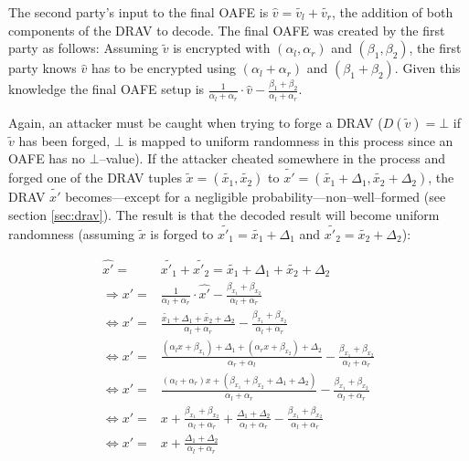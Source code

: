 The second party's input to the final OAFE is $\widehat{v} = \widetilde{v_l} +
\widetilde{v_r}$, the addition of both components of the DRAV to decode.  The
final OAFE was created by the first party as follows: Assuming $\widetilde{v}$
is encrypted with $(\alpha_l, \alpha_r)$ and $(\beta_1, \beta_2)$, the first
party knows $\widehat{v}$ has to be encrypted using $(\alpha_l + \alpha_r)$ and
$(\beta_1 + \beta_2)$.  Given this knowledge the final OAFE setup is
$\frac{1}{\alpha_l + \alpha_r} \cdot \widehat{v} - \frac{\beta_1 +
\beta_2}{\alpha_l + \alpha_r}$.

Again, an attacker must be caught when trying to forge a DRAV ($D(\widetilde{v})
= \bot$ if $\widetilde{v}$ has been forged, $\bot$ is mapped to uniform
randomness in this process since an OAFE has no $\bot$--value). If the attacker
cheated somewhere in the process and forged one of the DRAV tuples
$\widetilde{x} = (\widetilde{x_1}, \widetilde{x_2})$ to $\widetilde{x'} =
(\widetilde{x_1} + \Delta_1, \widetilde{x_2} + \Delta_2)$, the DRAV
$\widetilde{x'}$ becomes---except for a negligible
probability---non--well--formed (see section \ref{sec:drav}). The result is that
the decoded result will become uniform randomness (assuming $\widetilde{x}$ is
forged to $\widetilde{x'_1} = \widetilde{x_1} + \Delta_1$ and $\widetilde{x'_2}
= \widetilde{x_2} + \Delta_2$):

\begin{align*}
  \widehat{x'} = & \widetilde{x'_1} + \widetilde{x'_2} = \widetilde{x_1} +
  \Delta_1 + \widetilde{x_2} + \Delta_2 \\
  \Rightarrow x' = & \frac{1}{\alpha_l + \alpha_r} \cdot \widehat{x'} -
  \frac{\beta_{x_1} +
  \beta_{x_2}}{\alpha_l + \alpha_r} \\
  \Leftrightarrow x' = & \frac{\widetilde{x_1} + \Delta_1 +
  \widetilde{x_2} + \Delta_2}{\alpha_l + \alpha_r} -
  \frac{\beta_{x_1} +\beta_{x_2}}{\alpha_l + \alpha_r}\\
  \Leftrightarrow x' = & \frac{(\alpha_l x + \beta_{x_1}) + \Delta_1 +
  (\alpha_r x + \beta_{x_2}) + \Delta_2}{\alpha_r + \alpha_l} -
  \frac{\beta_{x_1} +\beta_{x_2}}{\alpha_l + \alpha_r} \\
  \Leftrightarrow x' = & \frac{(\alpha_l+\alpha_r)x + (\beta_{x_1}+\beta_{x_2} +
  \Delta_1+\Delta_2)}{\alpha_l+\alpha_r} -
  \frac{\beta_{x_1} +\beta_{x_2}}{\alpha_l + \alpha_r} \\
  \Leftrightarrow x' = & x + \frac{\beta_{x_1}+\beta_{x_2}}{\alpha_l+\alpha_r}
  + \frac{\Delta_1 + \Delta_2}{\alpha_l + \alpha_r} -
  \frac{\beta_{x_1}+\beta_{x_2}}{\alpha_l + \alpha_r} \\
  \Leftrightarrow x' = & x + \frac{\Delta_1 + \Delta_2}{\alpha_l + \alpha_r}\\
\end{align*}

